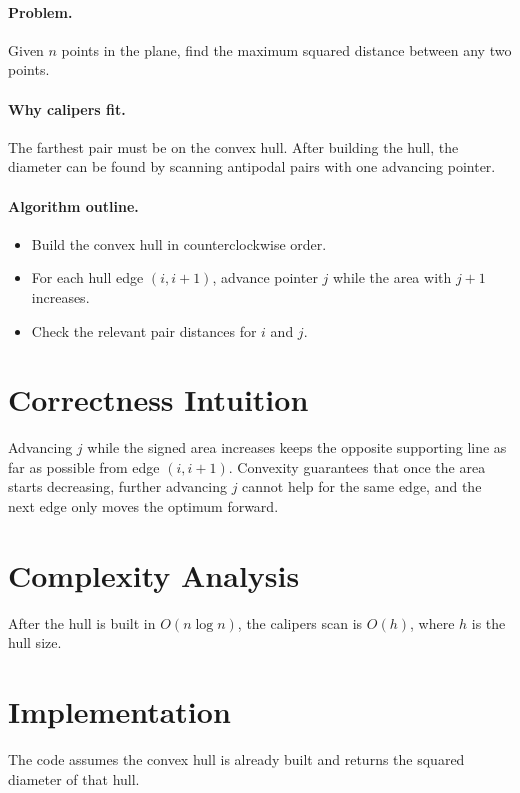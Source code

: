 \paragraph{Problem.}
Given \(n\) points in the plane, find the maximum squared distance between any two points.

\paragraph{Why calipers fit.}
The farthest pair must be on the convex hull. After building the hull, the diameter can be found by scanning antipodal
pairs with one advancing pointer.

\paragraph{Algorithm outline.}

\begin{itemize}
  \item Build the convex hull in counterclockwise order.
  \item For each hull edge \((i, i+1)\), advance pointer \(j\) while the area with \(j+1\) increases.
  \item Check the relevant pair distances for \(i\) and \(j\).
\end{itemize}

\section*{Correctness Intuition}

Advancing \(j\) while the signed area increases keeps the opposite supporting line as far as possible from edge
\((i,i+1)\). Convexity guarantees that once the area starts decreasing, further advancing \(j\) cannot help for the same
edge, and the next edge only moves the optimum forward.

\section*{Complexity Analysis}

After the hull is built in \(O(n \log n)\), the calipers scan is \(O(h)\), where \(h\) is the hull size.

\section*{Implementation}

The code assumes the convex hull is already built and returns the squared diameter of that hull.

